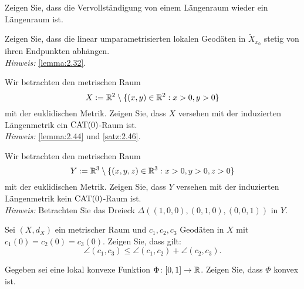 	\begin{aufgabe}
		\label{aufg:5.5}	
		Zeigen Sie, dass die Vervollständigung von einem Längenraum wieder ein Längenraum ist.
	\end{aufgabe}
	
	\begin{aufgabe}
		\label{aufg:6.1}
		Zeigen Sie, dass die linear umparametrisierten lokalen Geodäten in $\tilde{X}_{x_0}$ stetig von ihren Endpunkten abhängen. \\
		\textit{Hinweis:} \autoref{lemma:2.32}.
	\end{aufgabe}
	
	\begin{aufgabe}
		\label{aufg:6.2}
		Wir betrachten den metrischen Raum
		\[
			X := \mathbb{R}^2 \setminus \{(x,y) \in \mathbb{R}^2 : x > 0, y>0\}
		\]
		mit der euklidischen Metrik.
		Zeigen Sie, dass $X$ versehen mit der induzierten Längenmetrik ein $\operatorname{CAT(0)}$-Raum ist. \\
		\textit{Hinweis:} \autoref{lemma:2.44} und \autoref{satz:2.46}.
	\end{aufgabe}
	
	\begin{aufgabe}
		\label{aufg:6.3}
		Wir betrachten den metrischen Raum
		\[
			Y := \mathbb{R}^3 \setminus \{(x,y,z) \in \mathbb{R}^3 : x > 0, y>0, z >0\}
		\]
		mit der euklidischen Metrik.
		Zeigen Sie, dass $Y$ versehen mit der induzierten Längenmetrik kein $\operatorname{CAT(0)}$-Raum ist. \\
		\textit{Hinweis:} Betrachten Sie das Dreieck $\Delta((1,0,0),(0,1,0),(0,0,1))$ in $Y$.
	\end{aufgabe}
	
	\begin{aufgabe}
		\label{aufg:6.4}
		Sei $(X,d_X)$ ein metrischer Raum und $c_1,c_2,c_3$ Geodäten in $X$ mit $c_1(0) = c_2(0) = c_3(0)$.
		Zeigen Sie, dass gilt:
		\[
			\angle(c_1,c_3) \leq \angle(c_1,c_2) + \angle(c_2,c_3).
		\]
	\end{aufgabe}
	
	\begin{aufgabe}
		\label{aufg:7.1}
		Gegeben sei eine lokal konvexe Funktion $\Phi\colon [0,1] \rightarrow \mathbb{R}$.
		Zeigen Sie, dass $\Phi$ konvex ist.
	\end{aufgabe}
	

